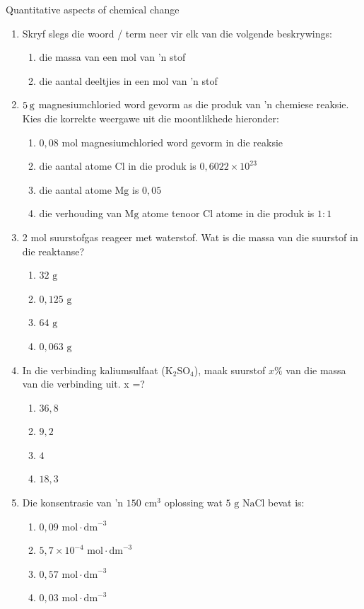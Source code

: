             \begin{eocexercises}{Quantitative aspects of chemical change}
            \nopagebreak \noindent
\begin{enumerate}[noitemsep, label=\textbf{\arabic*}. ] 
\item Skryf slegs die woord / term neer vir elk van die volgende beskrywings:
 \begin{enumerate}[noitemsep, label=\textbf{\alph*}. ] 
 \item die massa van een mol van  'n stof
 \item die aantal deeltjies in een mol van  'n stof
\end{enumerate}
 \item $5\phantom{\rule{2pt}{0ex}}\text{g}$ magnesiumchloried word gevorm as die produk van  'n chemiese reaksie.  Kies die korrekte weergawe uit die moontlikhede hieronder:
  \begin{enumerate}[noitemsep, label=\textbf{\alph*}. ] 
  \item $0,08$ mol magnesiumchloried word gevorm in die reaksie
  \item die aantal atome $\text{Cl}$ in die produk is $0,6022\ensuremath{\times}{10}^{23}$
  \item die aantal atome $\text{Mg}$ is $0,05$
  \item die verhouding van $\text{Mg}$ atome tenoor $\text{Cl}$ atome in die produk is $1:1$
  \end{enumerate}
 \item 2 mol suurstofgas reageer met waterstof. Wat is die massa van die suurstof in die reaktanse?
  \begin{enumerate}[noitemsep, label=\textbf{\alph*}. ]
  \item $32 \text{ g}$
  \item $0,125 \text{ g}$
  \item $64 \text{ g}$
  \item $0,063 \text{ g}$
  \end{enumerate}
 \item In die verbinding kaliumsulfaat ($\text{K}{}_{2}\text{SO}{}_{4}$), maak suurstof  $x\%$ van die massa van die verbinding uit. x =?
  \begin{enumerate}[noitemsep, label=\textbf{\alph*}. ]
  \item $36,8$
  \item $9,2$
  \item $4$
  \item $18,3$
  \end{enumerate}
 \item Die konsentrasie van  'n $150 {\text{ cm}}^{3}$ oplossing wat $5 \text{ g}$ $\text{NaCl}$ bevat is:
  \begin{enumerate}[noitemsep, label=\textbf{\alph*}. ]
  \item $0,09 \text{ mol} \cdot \text{dm}^{-3}$
  \item $5,7 \times 10^{-4} \text{ mol} \cdot \text{dm}^{-3}$
  \item $0,57 \text{ mol} \cdot \text{dm}^{-3}$
  \item $0,03 \text{ mol} \cdot \text{dm}^{-3}$
  \end{enumerate}


\end{enumerate}
\end{eocexercises}
